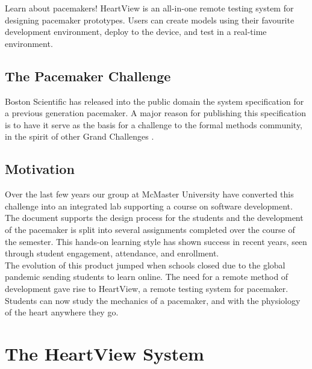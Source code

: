 \documentclass[11pt,fleqn]{book} %
\begin{document}
Learn about pacemakers! HeartView is an all-in-one remote testing system for designing pacemaker prototypes. Users can create models using their favourite development environment, deploy to the device, and test in a real-time environment. 



\section{The Pacemaker Challenge}

Boston Scientific has released into the public domain the system specification for a previous generation pacemaker. A major reason for publishing this specification is to have it serve as the basis for a challenge to the formal methods community, in the spirit of other Grand Challenges \cite{sqrl_pacemaker}.



\section{Motivation}

Over the last few years our group at McMaster University have converted this challenge into an integrated lab supporting a course on software development. The document supports the design process for the students and the development of the pacemaker is split into several assignments completed over the course of the semester. This hands-on learning style has shown success in recent years, seen through student engagement, attendance, and enrollment.\\

The evolution of this product jumped when schools closed due to the global pandemic sending students to learn online. The need for a remote method of development gave rise to HeartView, a remote testing system for pacemaker. Students can now study the mechanics of a pacemaker, and with the physiology of the heart anywhere they go.\\





\chapter{The HeartView System}
\end{document}
